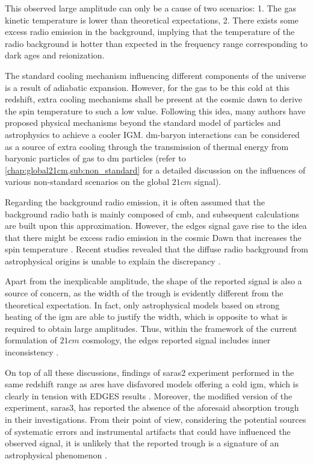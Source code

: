 \documentclass[12pt, TexShade, letterpaper]{report}
\begin{document}
 This observed large amplitude can only be a cause of two scenarios: 1. The gas kinetic temperature is lower than theoretical expectations, 2. There exists some excess radio emission in the background, implying that the temperature of the radio background is hotter than expected in the frequency range corresponding to dark ages and reionization. \par
 The standard cooling mechanism influencing different components of the universe is a result of adiabatic expansion. However, for the gas to be this cold at this redshift, extra cooling mechanisms shall be present at the cosmic dawn to derive the spin temperature to such a low value. Following this idea, many authors have proposed physical mechanisms beyond the standard model of particles and astrophysics to achieve a cooler IGM. \gls{dm}-baryon interactions can be considered as a source of extra cooling through the transmission of thermal energy from baryonic particles of gas to \gls{dm} particles \cite{dm_edges_1, dm_edges_2, dm_edges_3, dm_edges_4, dm_edges_5, dm_edges_6} (refer to \ref{chap:global21cm,sub:non_standard} for a detailed discussion on the influences of various non-standard scenarios on the global $21cm$ signal).\par
 Regarding the background radio emission, it is often assumed that the background radio bath is mainly composed of \gls{cmb}, and subsequent calculations are built upon this approximation. However, the \gls{edges} signal gave rise to the idea that there might be excess radio emission in the cosmic Dawn that increases the spin temperature \cite{excess_radio}. Recent studies revealed that the diffuse radio background from astrophysical origins is unable to explain the discrepancy \cite{excess_radio, thesis_shedding}.\par
 Apart from the inexplicable amplitude, the shape of the reported signal is also a source of concern, as the width of the trough is evidently different from the theoretical expectation. In fact, only astrophysical models based on strong heating of the \gls{igm} are able to justify the width, which is opposite to what is required to obtain large amplitudes. Thus, within the framework of the current formulation of $21cm$ cosmology, the \gls{edges} reported signal includes inner inconsistency \cite{edges_inconsistent_inner, thesis_shedding}.\par
 On top of all these discussions, findings of \gls{saras}2 experiment performed in the same redshift range as \gls{ares} have disfavored models offering a cold \gls{igm}, which is clearly in tension with EDGES results \cite{saras_2_constrains, saras_2_results}. Moreover, the modified version of the experiment, \gls{saras}3, has reported the absence of the aforesaid absorption trough in their investigations. From their point of view, considering the potential sources of systematic errors and instrumental artifacts that could have influenced the observed signal, it is unlikely that the reported trough is a signature of an astrophysical phenomenon \cite{saras_3_results, saras_curse_edges}.\par
\end{document}
